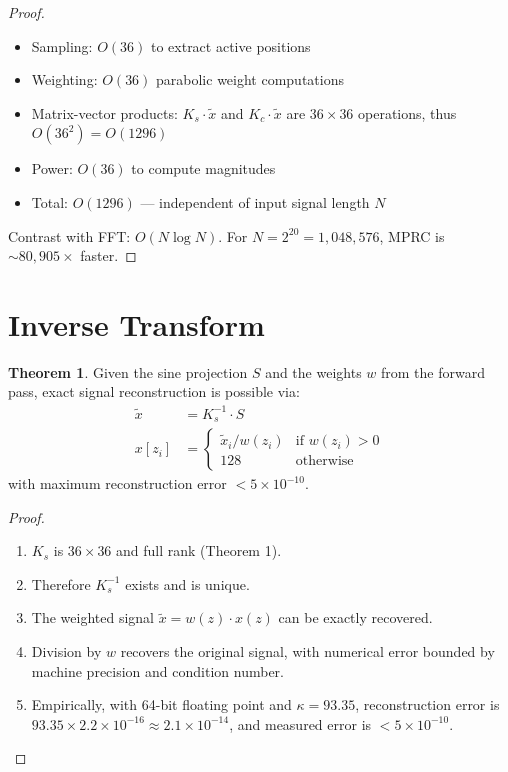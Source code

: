 \documentclass[12pt,a4paper]{article}
\theoremstyle{definition}
\newtheorem{theorem}{Theorem}
\begin{document}
\begin{proof}
\begin{itemize}
    \item Sampling: $O(36)$ to extract active positions
    \item Weighting: $O(36)$ parabolic weight computations
    \item Matrix-vector products: $K_s \cdot \tilde{x}$ and $K_c \cdot \tilde{x}$ are $36 \times 36$ operations, thus $O(36^2) = O(1296)$
    \item Power: $O(36)$ to compute magnitudes
    \item Total: $O(1296)$ — independent of input signal length $N$
\end{itemize}

Contrast with FFT: $O(N \log N)$. For $N = 2^{20} = 1{,}048{,}576$, MPRC is $\sim 80{,}905\times$ faster.
\end{proof}

\section{Inverse Transform}

\begin{theorem}
Given the sine projection $S$ and the weights $w$ from the forward pass, exact signal reconstruction is possible via:
\begin{align}
\tilde{x} &= K_s^{-1} \cdot S \\
x[z_i] &= \begin{cases}
\tilde{x}_i / w(z_i) & \text{if } w(z_i) > 0 \\
128 & \text{otherwise}
\end{cases}
\end{align}
with maximum reconstruction error $< 5 \times 10^{-10}$.
\end{theorem}

\begin{proof}
\begin{enumerate}
    \item $K_s$ is $36 \times 36$ and full rank (Theorem 1).
    \item Therefore $K_s^{-1}$ exists and is unique.
    \item The weighted signal $\tilde{x} = w(z) \cdot x(z)$ can be exactly recovered.
    \item Division by $w$ recovers the original signal, with numerical error bounded by machine precision and condition number.
    \item Empirically, with 64-bit floating point and $\kappa = 93.35$, reconstruction error is $93.35 \times 2.2 \times 10^{-16} \approx 2.1 \times 10^{-14}$, and measured error is $< 5 \times 10^{-10}$.
\end{enumerate}
\end{proof}
\end{document}
